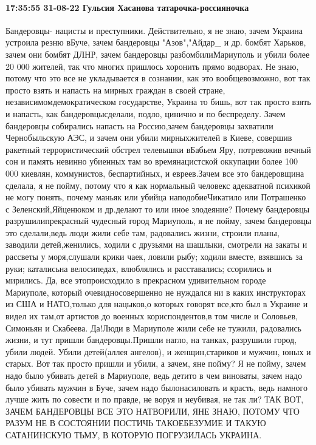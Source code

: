  
 
 
 
 


\paragraph{17:35:55 31-08-22 Гульсия Хасанова татарочка-россияночка}

Бандеровцы- нацисты и преступники. Действительно, я не знаю, зачем Украина
устроила резню вБуче, зачем бандеровцы "Азов","Айдар_ и др. бомбят Харьков,
зачем они бомбят ДЛНР, зачем бандеровцы разбомбилиМариуполь и убили более 20
000 жителей, так что многих пришлось хоронить прямо водворах. Не знаю, потому
что это все не укладывается в сознании, как это вообщевозможно, вот так просто
взять и напасть на мирных граждан в своей стране, независимомдемократическом
государстве, Украина то бишь, вот так просто взять и напасть, как
бандеровцысделали, подло, цинично и по беспределу. Зачем бандеровцы собирались
напасть на Россию,зачем бандеровцы захватили Чернобыльскую АЭС, и зачем они
убили мирныхжителей в Киеве, совершив ракетный террористический обстрел
телевышки вБабьем Яру, потревожив вечный сон и память невинно убиенных там во
времянацистской оккупации более 100 000 киевлян, коммунистов, беспартийных, и
евреев.Зачем все это бандеровщина сделала, я не пойму, потому что я как
нормальный человекс адекватной психикой не могу понять, почему маньяк или
убийца наподобиеЧикатило или Потрашенко с Зеленский,Яйценюком и др.делают то
или иное злодеяние? Почему бандеровцы разрушилипрекрасный чудесный город
Мариуполь, я не пойму, зачем бандеровцы это сделали,ведь люди жили себе там,
радовались жизни, строили планы, заводили детей,женились, ходили с друзьями на
шашлыки, смотрели на закаты и рассветы у моря,слушали крики чаек, ловили рыбу;
ходили вместе, взявшись за руки; каталисьна велосипедах, влюблялись и
расставались; ссорились и мирились. Да, все этопроисходило в прекрасном
удивительном городе Мариуполе, который очевидносовершенно не нуждался ни в
каких инструкторах из США и НАТО,только для нацыков,о которых говорят все,кто
был в Украине и видел их там,от артистов до военных кориспондентов,в том числе
и Соловьев, Симоньян и Скабеева. Да!Люди в Мариуполе жили себе не тужили,
радовались жизни, и тут пришли бандеровцы.Пришли нагло, на танках, разрушили
город, убили людей. Убили детей(аллея ангелов), и женщин,стариков и мужчин,
юных и старых. Вот так просто пришли и убили, а зачем, яне пойму? Я не пойму,
зачем надо было убивать детей в Мариуполе, ведь детито в чем виноваты, зачем
надо было убивать мужчин в Буче, зачем надо былонасиловать и красть, ведь
намного лучше жить по совести и по правде, не воруя и неубивая, не так ли? ТАК
ВОТ, ЗАЧЕМ БАНДЕРОВЦЫ ВСЕ ЭТО НАТВОРИЛИ, ЯНЕ ЗНАЮ, ПОТОМУ ЧТО РАЗУМ НЕ В
СОСТОЯНИИ ПОСТИЧЬ ТАКОЕБЕЗУМИЕ И ТАКУЮ САТАНИНСКУЮ ТЬМУ, В КОТОРУЮ ПОГРУЗИЛАСЬ
УКРАИНА.
